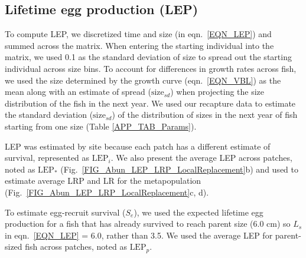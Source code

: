 \documentclass[12pt, oneside]{article}   	%
\begin{document}

\subsection{Lifetime egg production (LEP)} \label{APP_SEC_METHODS_LEP}

To compute LEP, we discretized time and size (in eqn.\ \ref{EQN_LEP}) and summed across the matrix. When entering the starting individual into the matrix, we used 0.1 as the standard deviation of size to spread out the starting individual across size bins. To account for differences in growth rates across fish, we used the size determined by the growth curve (eqn.\ \ref{EQN_VBL}) as the mean along with an estimate of spread ($\text{size}_{sd}$) when projecting the size distribution of the fish in the next year. We used our recapture data to estimate the standard deviation ($\text{size}_{sd}$) of the distribution of sizes in the next year of fish starting from one size (Table \ref{APP_TAB_Params}). %

LEP was estimated by site because each patch has a different estimate of survival, represented as $\text{LEP}_i$. We also present the average LEP across patches, noted as $\text{LEP}_*$ (Fig.\ \ref{FIG_Abun_LEP_LRP_LocalReplacement}b) and used to estimate average LRP and LR for the metapopulation (Fig.\ \ref{FIG_Abun_LEP_LRP_LocalReplacement}c, d). 

To estimate egg-recruit survival ($S_e$), we used the expected lifetime egg production for a fish that has already survived to reach parent size (6.0 cm) so $L_s$ in eqn.\ \ref{EQN_LEP} = 6.0, rather than 3.5. We used the average LEP for parent-sized fish across patches, noted as $\text{LEP}_p$.
\end{document}
